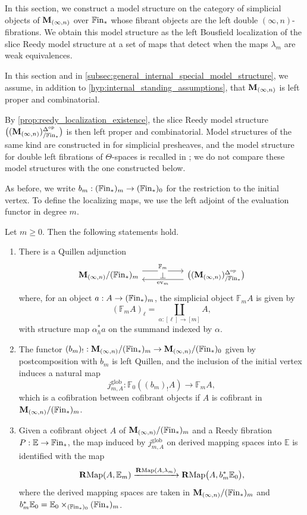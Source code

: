 \documentclass[10pt,reqno]{amsart}
\begin{document}
In this section, we construct a model structure on the category of
simplicial objects of $\mathbf M_{(\infty,n)}$ over $\mathbb{F}\mathrm{in}_*$ whose fibrant
objects are the left double $(\infty,n)$-fibrations. We obtain this
model structure as the left Bousfield localization of the slice Reedy
model structure at a set of maps that detect when the maps
$\lambda_m$ are weak equivalences.

\begin{hypothesis}
\label{hyp:internal_localization_assumptions}
In this section and in
\cref{subsec:general_internal_special_model_structure}, we assume,
in addition to \cref{hyp:internal_standing_assumptions}, that
$\mathbf M_{(\infty,n)}$ is left proper and combinatorial.
\end{hypothesis}

By \cref{prop:reedy_localization_existence}, the slice Reedy model
structure
$\bigl((\mathbf M_{(\infty,n)})^{\Delta^{\mathrm{op}}}_{/\mathbb{F}\mathrm{in}_*}\bigr)$
is then left proper and combinatorial. Model structures of the same
kind are constructed in
\cite[Theorems~4.17 and~5.15]{Rasekh2021Yoneda} for simplicial
presheaves, and the model structure for double left fibrations of
$\Theta$-spaces is recalled in
\cite[\S2.2 and Remark~2.2.5]{MoserRasekhRovelli2024LimitsII}; we do
not compare these model structures with the one constructed below.

As before, we write $b_m:(\mathbb{F}\mathrm{in}_*)_m\to(\mathbb{F}\mathrm{in}_*)_0$ for the
restriction to the initial vertex. To define the localizing maps, we
use the left adjoint of the evaluation functor in degree $m$.

\begin{lemma}
\label{lem:slice_evaluation_source_adjunction}
Let $m\geq0$. Then the following statements hold.
\begin{enumerate}[label=\textup{(\arabic*)}]
\item There is a Quillen adjunction
\[
\adjunction{\Minfn/(\bisimFin)_m}
{\bigl((\Minfn)^{\Delta^{\mathrm{op}}}_{/\bisimFin}\bigr)}
{\mathbb F_m}{\operatorname{ev}_m}
\]
where, for an object $a:A\to(\mathbb{F}\mathrm{in}_*)_m$, the simplicial object
$\mathbb F_mA$ is given by
\[
(\mathbb F_mA)_\ell=
\coprod_{\alpha:[\ell]\to[m]}A,
\]
with structure map $\alpha_h^*a$ on the summand indexed by
$\alpha$.
\item The functor
$(b_m)_!:\mathbf M_{(\infty,n)}/(\mathbb{F}\mathrm{in}_*)_m\to\mathbf M_{(\infty,n)}/(\mathbb{F}\mathrm{in}_*)_0$ given by
postcomposition with $b_m$ is left Quillen, and the inclusion of the
initial vertex induces a natural map
\[
j^{\mathrm{glob}}_{m,A}:
\mathbb F_0((b_m)_!A)\longrightarrow\mathbb F_mA,
\]
which is a cofibration between cofibrant objects if $A$ is cofibrant
in $\mathbf M_{(\infty,n)}/(\mathbb{F}\mathrm{in}_*)_m$.
\item Given a cofibrant object $A$ of $\mathbf M_{(\infty,n)}/(\mathbb{F}\mathrm{in}_*)_m$ and a
Reedy fibration $P:\mathbb E\to\mathbb{F}\mathrm{in}_*$, the map induced by
$j^{\mathrm{glob}}_{m,A}$ on derived mapping spaces into
$\mathbb E$ is identified with the map
\[
\mathbf{R}\mathrm{Map}(A,\mathbb E_m)
\xrightarrow{\mathbf{R}\mathrm{Map}(A,\lambda_m)}
\mathbf{R}\mathrm{Map}\bigl(A,b_m^*\mathbb E_0\bigr),
\]
where the derived mapping spaces are taken in
$\mathbf M_{(\infty,n)}/(\mathbb{F}\mathrm{in}_*)_m$ and
$b_m^*\mathbb E_0=
\mathbb E_0\times_{(\mathbb{F}\mathrm{in}_*)_0}(\mathbb{F}\mathrm{in}_*)_m$.
\end{enumerate}
\end{lemma}
\end{document}
